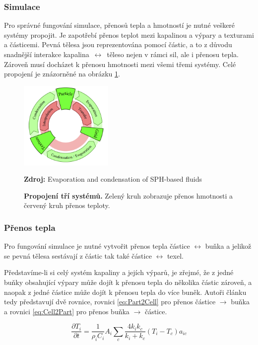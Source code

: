 \subsubsection{Simulace}
Pro správné fungování simulace, přenosů tepla a hmotností je nutné veškeré systémy propojit. Je zapotřebí přenos teplot mezi kapalinou a výpary a texturami a částicemi. Pevná tělesa jsou reprezentována pomocí částic, a to z důvodu snadnější interakce kapalina~$\leftrightarrow$~\mbox{těleso} nejen v rámci sil, ale i přenosu tepla. Zároveň musí docházet k přenosu hmotnosti mezi všemi třemi systémy. Celé propojení je znázorněné na obrázku \ref{fig:EvapCycle}.

\begin{figure}[hbt]
	\centering
	\captionsetup{justification=centering}
	\includegraphics[width=0.4\textwidth]{obrazky-figures/evapCycle.PNG}
	\caption{\textbf{Propojení tří systémů.} Zelený kruh zobrazuje přenos hmotnosti a červený kruh přenos teploty.}
	\textbf{Zdroj: } Evaporation and condensation of SPH-based fluids \cite{Evap&Cond}
	\label{fig:EvapCycle}
\end{figure}

\subsubsection{Přenos tepla}
Pro fungování simulace je nutné vytvořit přenos tepla částice $\leftrightarrow$ buňka a jelikož se pevná tělesa sestávají z částic tak také částice $\leftrightarrow$ texel. 

Představíme-li si celý systém kapaliny a jejích výparů, je zřejmé, že z jedné buňky obsahující výpary může dojít k přenosu tepla do několika částic zároveň, a naopak z jedné částice může dojít k přenosu tepla do více buněk. Autoři článku tedy představují dvě rovnice, rovnici \ref{eq:Part2Cell} pro přenos částice $\rightarrow$ buňka a rovnici \ref{eq:Cell2Part} pro přenos buňka $\rightarrow$ částice.

\begin{equation}
    \frac{\partial T_i}{\partial t} = \frac{1}{\rho_i C_i} A_i \sum_c \frac{4 k_i k_c}{k_i + k_c}(T_i - T_c)a_{ic}
    \label{eq:Part2Cell}
\end{equation}

